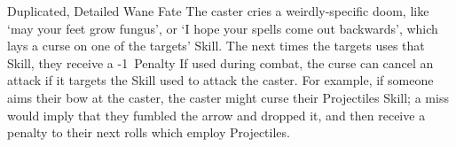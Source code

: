   {Duplicated, Detailed}%
  {Wane}%
  {Fate}%
  {}%
  {The caster cries a weirdly-specific doom, like `may your feet grow fungus', or `I hope your spells come out backwards', which lays a curse on one of the targets' Skill.
  The next  times the targets uses that Skill, they receive a -1~Penalty}%
  {If used during combat, the curse can cancel an attack if it targets the Skill used to attack the caster.
  For example, if someone aims their bow at the caster, the caster might curse their Projectiles Skill; a miss would imply that they fumbled the arrow and dropped it, and then receive a penalty to their next  rolls which employ Projectiles.}
